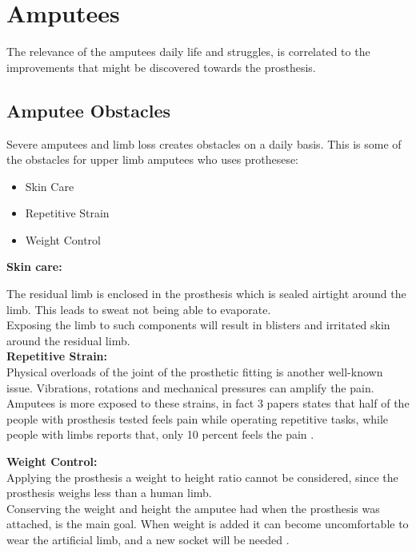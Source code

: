 \chapter{Amputees}\label{ch:Amputee}

The relevance of the amputees daily life and struggles, is correlated to the improvements that might be discovered towards the prosthesis.\\

\section{Amputee Obstacles}

Severe amputees and limb loss creates obstacles on a daily basis. This is some of the obstacles for upper limb amputees who uses prothesese:\\
\begin{itemize}
    \item Skin Care
    \item Repetitive Strain
    \item Weight Control
\end{itemize}

\textbf{Skin care:}

The residual limb is enclosed in the prosthesis which is sealed airtight around the limb. This leads to sweat not being able to evaporate.\\
Exposing the limb to such components will result in blisters and irritated skin around the residual limb\cite{SkinCare}.\\

\textbf{Repetitive Strain:}\\
Physical overloads of the joint of the prosthetic fitting is another well-known issue. Vibrations, rotations and mechanical pressures can amplify the pain.\\
Amputees is more exposed to these strains, in fact 3 papers states that half of the people with prosthesis tested feels pain while operating repetitive tasks, while people with limbs reports that, only 10 percent feels the pain \cite{StrainInjuries}.\\
\clearpage

\textbf{Weight Control:}\\

Applying the prosthesis a weight to height ratio cannot be considered, since the prosthesis weighs less than a human limb.\\
Conserving the weight and height the amputee had when the prosthesis was attached, is the main goal. When weight is added it can become uncomfortable to wear the artificial limb, and a new socket will be needed \cite{weightControl}.

